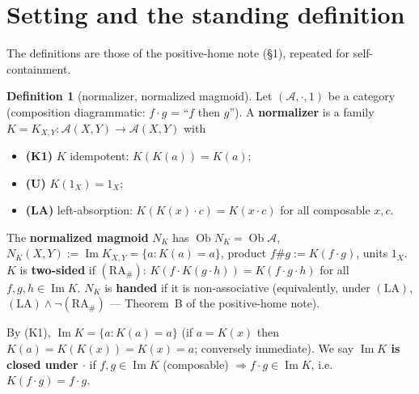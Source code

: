 \documentclass[11pt]{article}
\theoremstyle{plain}
\theoremstyle{definition}
\newtheorem{definition}{Definition}[section]
\theoremstyle{remark}
\newcommand{\Acat}{\mathcal{A}}
\renewcommand{\Im}{\operatorname{Im}}
\newcommand{\Ob}{\operatorname{Ob}}
\newcommand{\NK}{N_K}
\begin{document}
\section{Setting and the standing definition}

The definitions are those of the positive-home note (\S1), repeated for self-containment.

\begin{definition}[normalizer, normalized magmoid]
Let $(\Acat, \cdot, 1)$ be a category (composition diagrammatic: $f\cdot g$ = ``$f$ then $g$'').
A \textbf{normalizer} is a family $K = K_{X,Y} : \Acat(X,Y) \to \Acat(X,Y)$ with
\begin{itemize}[leftmargin=2em]
\item \textbf{(K1)} $K$ idempotent: $K(K(a)) = K(a)$;
\item \textbf{(U)} $K(1_X) = 1_X$;
\item \textbf{(LA)} left-absorption: $K(K(x)\cdot c) = K(x\cdot c)$ for all composable $x, c$.
\end{itemize}
The \textbf{normalized magmoid} $\NK$ has $\Ob \NK = \Ob \Acat$,
$\NK(X,Y) := \Im K_{X,Y} = \{ a : K(a) = a \}$, product $f \# g := K(f\cdot g)$, units $1_X$.
$K$ is \textbf{two-sided} if $(\mathrm{RA}_\#)$: $K(f\cdot K(g\cdot h)) = K(f\cdot g\cdot h)$ for all
$f,g,h \in \Im K$. $\NK$ is \textbf{handed} if it is non-associative (equivalently, under
$(\mathrm{LA})$, $(\mathrm{LA}) \wedge \neg(\mathrm{RA}_\#)$ --- Theorem~B of the positive-home note).
\end{definition}

By (K1), $\Im K = \{a : K(a)=a\}$ (if $a = K(x)$ then $K(a)=K(K(x))=K(x)=a$; conversely immediate).
We say \textbf{$\Im K$ is closed under $\cdot$} if $f, g \in \Im K$ (composable) $\Rightarrow f\cdot
g \in \Im K$, i.e. $K(f\cdot g) = f\cdot g$.
\end{document}
